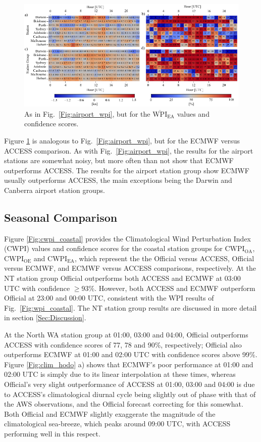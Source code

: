 \documentclass[twocol]{ametsoc}
\begin{document}
\begin{figure}
\centering
\includegraphics[width=39pc]{airport_wpi_EA.pdf}
\caption{As in Fig.~\ref{Fig:airport_wpi}, but for the $\overline{\text{WPI}}_\text{EA}$ values and confidence scores.}
\label{Fig:airport_wpi_EA}
\end{figure}

Figure \ref{Fig:airport_wpi_EA} is analogous to Fig.~\ref{Fig:airport_wpi}, but for the ECMWF versus ACCESS comparison. As with Fig.~\ref{Fig:airport_wpi}, the results for the airport stations are somewhat noisy, but more often than not show that ECMWF outperforms ACCESS. The results for the airport station group show ECMWF usually outperforms ACCESS, the main exceptions being the Darwin and Canberra airport station groups.  

\subsection{Seasonal Comparison}
\label{Sec:Seasonal}
Figure \ref{Fig:cwpi_coastal} provides the Climatological Wind Perturbation Index (CWPI) values and confidence scores for the coastal station groups for $\text{CWPI}_\text{OA}$, $\text{CWPI}_\text{OE}$ and $\text{CWPI}_\text{EA}$, which represent the the Official versus ACCESS, Official versus ECMWF, and ECMWF versus ACCESS comparisons, respectively. At the NT station group Official outperforms both ACCESS and ECMWF at 03:00 UTC with confidence $\geq 93\%$. However, both ACCESS and ECMWF outperform Official at 23:00 and 00:00 UTC, consistent with the $\overline{\text{WPI}}$ results of Fig.~\ref{Fig:wpi_coastal}. The NT station group results are discussed in more detail in section \ref{Sec:Discussion}.

At the North WA station group at 01:00, 03:00 and 04:00, Official outperforms ACCESS with confidence scores of 77, 78 and 90\%, respectively; Official also outperforms ECMWF at 01:00 and 02:00 UTC with confidence scores above 99\%. Figure \ref{Fig:clim_hodo} a) shows that ECMWF's poor performance at 01:00 and 02:00 UTC is simply due to its linear interpolation at these times, whereas Official's very slight outperformance of ACCESS at 01:00, 03:00 and 04:00 is due to ACCESS's climatological diurnal cycle being slightly out of phase with that of the AWS observations, and the Official forecast correcting for this somewhat. Both Official and ECMWF slightly exaggerate the magnitude of the climatological sea-breeze, which peaks around 09:00 UTC, with ACCESS performing well in this respect.
\end{document}
